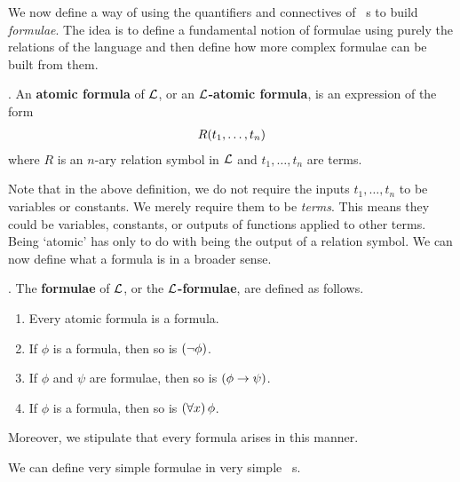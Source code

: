 We now define a way of using the quantifiers and connectives of \fola~s to build \textit{formulae}. The idea is to define a fundamental notion of formulae using purely the relations of the language and then define how more complex formulae can be built from them.

\begin{boxdefinition}
    . An \textbf{atomic formula} of $\mathcal{L}$, or an \textbf{$\mathcal{L}$-atomic formula}, is an expression of the form
    \begin{align*}
        R\!\left( t_1, \ldots, t_n \right)
    \end{align*}
    where $R$ is an $n$-ary relation symbol in $\mathcal{L}$ and $t_1, \ldots, t_n$ are terms.
\end{boxdefinition}

Note that in the above definition, we do not require the inputs $t_1, \ldots, t_n$ to be variables or constants. We merely require them to be \textit{terms}. This means they could be variables, constants, or outputs of functions applied to other terms. Being `atomic' has only to do with being the output of a relation symbol. We can now define what a formula is in a broader sense.

\begin{boxdefinition}[Formula]
    . The \textbf{formulae} of $\mathcal{L}$, or the \textbf{$\mathcal{L}$-formulae}, are defined as follows.
    \begin{enumerate}
        \item Every atomic formula is a formula.
        \item If $\phi$ is a formula, then so is $\left( \neg \phi \right)$.
        \item If $\phi$ and $\psi$ are formulae, then so is $\left( \phi \to \psi \right)$.
        \item If $\phi$ is a formula, then so is $\left( \forall x \right) \phi$.
    \end{enumerate}
    Moreover, we stipulate that every formula arises in this manner.
\end{boxdefinition}

We can define very simple formulae in very simple \fola~s.

